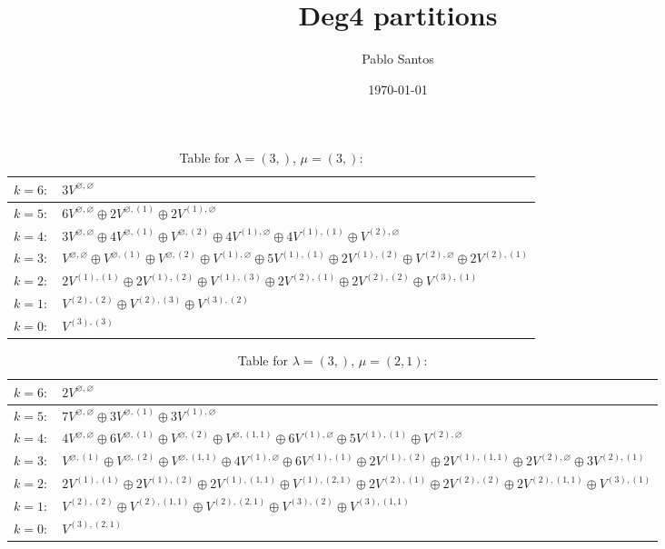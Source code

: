 \documentclass[a4paper,12pt]{article}
\title{Deg4 partitions}
\author{Pablo Santos}
\date{\today}
\begin{document}
\renewcommand{\arraystretch}{1.6} 
\begin{table}[H]
\centering
\caption{Table for $\lambda = (3,)$, $\mu = (3,)$:}
\begin{tabular}{|>{\centering\arraybackslash}p{15cm}|}
\hline
 $k = 6: \quad 3 V^{\varnothing, \varnothing} $ \\ \hline
 $k = 5: \quad 6 V^{\varnothing, \varnothing} \oplus 2 V^{\varnothing, (1)} \oplus 2 V^{(1), \varnothing} $ \\ \hline
 $k = 4: \quad 3 V^{\varnothing, \varnothing} \oplus 4 V^{\varnothing, (1)} \oplus V^{\varnothing, (2)} \oplus 4 V^{(1), \varnothing} \oplus 4 V^{(1), (1)} \oplus V^{(2), \varnothing} $ \\ \hline
 $k = 3: \quad V^{\varnothing, \varnothing} \oplus V^{\varnothing, (1)} \oplus V^{\varnothing, (2)} \oplus V^{(1), \varnothing} \oplus 5 V^{(1), (1)} \oplus 2 V^{(1), (2)} \oplus V^{(2), \varnothing} \oplus 2 V^{(2), (1)} $ \\ \hline
 $k = 2: \quad 2 V^{(1), (1)} \oplus 2 V^{(1), (2)} \oplus V^{(1), (3)} \oplus 2 V^{(2), (1)} \oplus 2 V^{(2), (2)} \oplus V^{(3), (1)} $ \\ \hline
 $k = 1: \quad V^{(2), (2)} \oplus V^{(2), (3)} \oplus V^{(3), (2)} $ \\ \hline
 $k = 0: \quad V^{(3), (3)} $ \\ \hline
\end{tabular}
\end{table}

\renewcommand{\arraystretch}{1.6} 
\begin{table}[H]
\centering
\caption{Table for $\lambda = (3,)$, $\mu = (2, 1)$:}
\begin{tabular}{|>{\centering\arraybackslash}p{15cm}|}
\hline
 $k = 6: \quad 2 V^{\varnothing, \varnothing} $ \\ \hline
 $k = 5: \quad 7 V^{\varnothing, \varnothing} \oplus 3 V^{\varnothing, (1)} \oplus 3 V^{(1), \varnothing} $ \\ \hline
 $k = 4: \quad 4 V^{\varnothing, \varnothing} \oplus 6 V^{\varnothing, (1)} \oplus V^{\varnothing, (2)} \oplus V^{\varnothing, (1, 1)} \oplus 6 V^{(1), \varnothing} \oplus 5 V^{(1), (1)} \oplus V^{(2), \varnothing} $ \\ \hline
 $k = 3: \quad V^{\varnothing, (1)} \oplus V^{\varnothing, (2)} \oplus V^{\varnothing, (1, 1)} \oplus 4 V^{(1), \varnothing} \oplus 6 V^{(1), (1)} \oplus 2 V^{(1), (2)} \oplus 2 V^{(1), (1, 1)} \oplus 2 V^{(2), \varnothing} \oplus 3 V^{(2), (1)} $ \\ \hline
 $k = 2: \quad 2 V^{(1), (1)} \oplus 2 V^{(1), (2)} \oplus 2 V^{(1), (1, 1)} \oplus V^{(1), (2, 1)} \oplus 2 V^{(2), (1)} \oplus 2 V^{(2), (2)} \oplus 2 V^{(2), (1, 1)} \oplus V^{(3), (1)} $ \\ \hline
 $k = 1: \quad V^{(2), (2)} \oplus V^{(2), (1, 1)} \oplus V^{(2), (2, 1)} \oplus V^{(3), (2)} \oplus V^{(3), (1, 1)} $ \\ \hline
 $k = 0: \quad V^{(3), (2, 1)} $ \\ \hline
\end{tabular}
\end{table}
\end{document}
